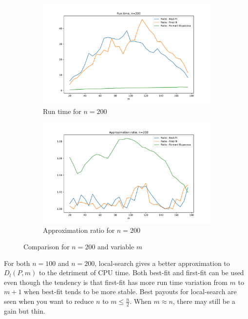 \documentclass{amsart}
\begin{document}
\begin{figure}[ht]
    \centering
    \begin{subfigure}[b]{0.45\textwidth}
        \centering
        \includegraphics[width=\textwidth]{plots/run time 200.pdf}
        \caption{Run time for $n=200$}
    \end{subfigure}
    \hfill
    \begin{subfigure}[b]{0.45\textwidth}
        \centering
        \includegraphics[width=\textwidth]{plots/ratio 200.pdf}
        \caption{Approximation ratio for $n=200$}
    \end{subfigure}
    \caption{Comparison for $n=200$ and variable $m$}
    \label{improvement ratio }
\end{figure}

For both $n=100$ and $n=200$, local-search gives a better approximation to $D_l\left(P,m\right)$ to the detriment of CPU time. Both best-fit and first-fit can be used even though the tendency is that first-fit has more run time variation from $m$ to $m+1$ when best-fit tends to be more stable. Best payouts for local-search are seen when you want to reduce $n$ to $m\leq\frac{n}{2}$. When $m\approx n$, there may still be a gain but thin. 
\end{document}

